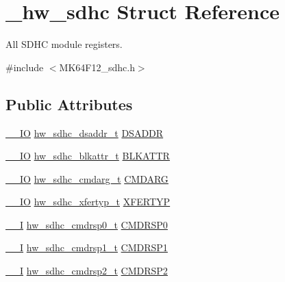 \hypertarget{struct__hw__sdhc}{}\section{\+\_\+hw\+\_\+sdhc Struct Reference}
\label{struct__hw__sdhc}


All S\+D\+HC module registers.  




{\ttfamily \#include $<$M\+K64\+F12\+\_\+sdhc.\+h$>$}

\subsection*{Public Attributes}
\begin{DoxyCompactItemize}
\item 
\hyperlink{core__sc300_8h_aec43007d9998a0a0e01faede4133d6be}{\+\_\+\+\_\+\+IO} \hyperlink{union__hw__sdhc__dsaddr}{hw\+\_\+sdhc\+\_\+dsaddr\+\_\+t} \hyperlink{struct__hw__sdhc_a2e715c1a0a6a3ce7a9c37ce9632ced3d}{D\+S\+A\+D\+DR}
\item 
\hyperlink{core__sc300_8h_aec43007d9998a0a0e01faede4133d6be}{\+\_\+\+\_\+\+IO} \hyperlink{union__hw__sdhc__blkattr}{hw\+\_\+sdhc\+\_\+blkattr\+\_\+t} \hyperlink{struct__hw__sdhc_a8a79f734fa65ded10bbf360492220041}{B\+L\+K\+A\+T\+TR}
\item 
\hyperlink{core__sc300_8h_aec43007d9998a0a0e01faede4133d6be}{\+\_\+\+\_\+\+IO} \hyperlink{union__hw__sdhc__cmdarg}{hw\+\_\+sdhc\+\_\+cmdarg\+\_\+t} \hyperlink{struct__hw__sdhc_a9f8a67b978da2c43a3686f8c7b321a08}{C\+M\+D\+A\+RG}
\item 
\hyperlink{core__sc300_8h_aec43007d9998a0a0e01faede4133d6be}{\+\_\+\+\_\+\+IO} \hyperlink{union__hw__sdhc__xfertyp}{hw\+\_\+sdhc\+\_\+xfertyp\+\_\+t} \hyperlink{struct__hw__sdhc_ab74624754fcc07680ac29f9a0b4e4809}{X\+F\+E\+R\+T\+YP}
\item 
\hyperlink{core__sc300_8h_af63697ed9952cc71e1225efe205f6cd3}{\+\_\+\+\_\+I} \hyperlink{union__hw__sdhc__cmdrsp0}{hw\+\_\+sdhc\+\_\+cmdrsp0\+\_\+t} \hyperlink{struct__hw__sdhc_a776f9a9ef3934b257c7241e793669c6c}{C\+M\+D\+R\+S\+P0}
\item 
\hyperlink{core__sc300_8h_af63697ed9952cc71e1225efe205f6cd3}{\+\_\+\+\_\+I} \hyperlink{union__hw__sdhc__cmdrsp1}{hw\+\_\+sdhc\+\_\+cmdrsp1\+\_\+t} \hyperlink{struct__hw__sdhc_ac14b293c1061ecb2ca7a0f66f6826aed}{C\+M\+D\+R\+S\+P1}
\item 
\hyperlink{core__sc300_8h_af63697ed9952cc71e1225efe205f6cd3}{\+\_\+\+\_\+I} \hyperlink{union__hw__sdhc__cmdrsp2}{hw\+\_\+sdhc\+\_\+cmdrsp2\+\_\+t} \hyperlink{struct__hw__sdhc_a0847d6954d20fd429000a9c739316e08}{C\+M\+D\+R\+S\+P2}

\end{DoxyCompactItemize}
